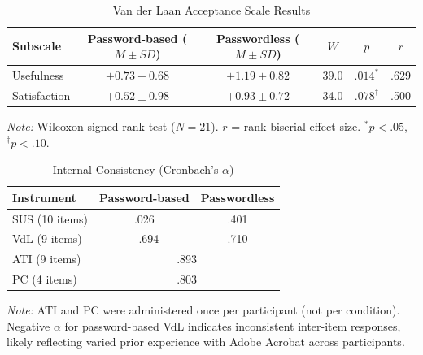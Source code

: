 \documentclass{article}
\begin{document}
\begin{table}[htbp]
    \centering
    \begin{threeparttable}
        \caption{Van der Laan Acceptance Scale Results}
        \label{tab:vdl-results}
        \begin{tabular}{lccccc}
            \toprule
            \textbf{Subscale} & \textbf{Password-based ($M \pm SD$)} & \textbf{Passwordless ($M \pm SD$)} & \textbf{$W$} & \textbf{$p$} & \textbf{$r$} \\
            \midrule
            Usefulness   & $+0.73 \pm 0.68$ & $+1.19 \pm 0.82$ & 39.0 & $.014^{*}$ & .629 \\
            Satisfaction & $+0.52 \pm 0.98$ & $+0.93 \pm 0.72$ & 34.0 & $.078^{\dagger}$ & .500 \\
            \bottomrule
        \end{tabular}
        \begin{tablenotes}
            \small
            \item \textit{Note:} Wilcoxon signed-rank test ($N = 21$). $r$ = rank-biserial effect size. $^{*} p < .05$, $^{\dagger} p < .10$.
        \end{tablenotes}
    \end{threeparttable}
\end{table}



\begin{table}[htbp]
    \centering
    \begin{threeparttable}
        \caption{Internal Consistency (Cronbach's $\alpha$)}
        \label{tab:cronbach}
        \begin{tabular}{lcc}
            \toprule
            \textbf{Instrument} & \textbf{Password-based} & \textbf{Passwordless} \\
            \midrule
            SUS (10 items)  & .026  & .401 \\
            VdL (9 items)   & $-$.694 & .710 \\
            \midrule
            ATI (9 items)   & \multicolumn{2}{c}{.893} \\
            PC (4 items)    & \multicolumn{2}{c}{.803} \\
            \bottomrule
        \end{tabular}
        \begin{tablenotes}
            \small
            \item \textit{Note:} ATI and PC were administered once per participant (not per condition). Negative $\alpha$ for password-based VdL indicates inconsistent inter-item responses, likely reflecting varied prior experience with Adobe Acrobat across participants.
        \end{tablenotes}
    \end{threeparttable}
\end{table}
\end{document}
